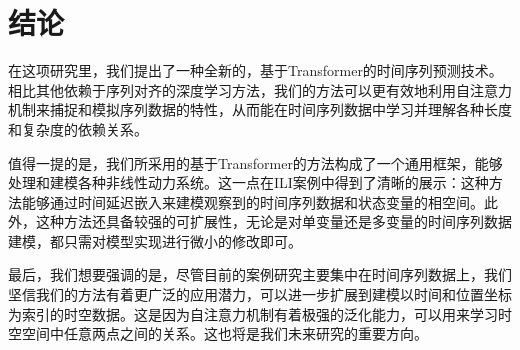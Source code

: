             \section{结论}
            在这项研究里，我们提出了一种全新的，基于Transformer的时间序列预测技术。相比其他依赖于序列对齐的深度学习方法，我们的方法可以更有效地利用自注意力机制来捕捉和模拟序列数据的特性，从而能在时间序列数据中学习并理解各种长度和复杂度的依赖关系。

            值得一提的是，我们所采用的基于Transformer的方法构成了一个通用框架，能够处理和建模各种非线性动力系统。这一点在ILI案例中得到了清晰的展示：这种方法能够通过时间延迟嵌入来建模观察到的时间序列数据和状态变量的相空间。此外，这种方法还具备较强的可扩展性，无论是对单变量还是多变量的时间序列数据建模，都只需对模型实现进行微小的修改即可。
            
            最后，我们想要强调的是，尽管目前的案例研究主要集中在时间序列数据上，我们坚信我们的方法有着更广泛的应用潜力，可以进一步扩展到建模以时间和位置坐标为索引的时空数据。这是因为自注意力机制有着极强的泛化能力，可以用来学习时空空间中任意两点之间的关系。这也将是我们未来研究的重要方向。
